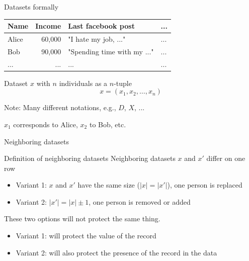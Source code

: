 \documentclass[12pt,aspectratio=169,handout]{beamer}
\begin{document}
\begin{frame}{Datasets formally}
	
\begin{table}
	\begin{tabular}{lrll}
		\toprule
		Name & Income & Last facebook post & ... \\
		\midrule
		Alice & 60,000 & "I hate my job, ..." & ... \\
		Bob & 90,000 & "Spending time with my ..." & ...\\
		... & ... & ... & ...\\
		\bottomrule
	\end{tabular}
\end{table}

\begin{block}{Dataset $x$ with $n$ individuals as a $n$-tuple}
$$
x = (x_1, x_2, \ldots, x_n)
$$
\end{block}

Note: Many different notations, e.g., $D$, $X$, ...

$x_1$ corresponds to Alice, $x_2$ to Bob, etc.


\end{frame}


\begin{frame}{Neighboring datasets}

\begin{block}{Definition of neighboring datasets}
Neighboring datasets $x$ and $x'$ differ on one row
\end{block}

\begin{itemize}
	\item Variant 1: $x$ and $x'$ have the same size ($|x| = |x'|$), one person is replaced
	\item Variant 2: $|x'| = |x| \pm 1$, one person is removed or added
\end{itemize}


These two options will not protect the same thing.

\begin{itemize}
	\item Variant 1: will protect the value of the record
	\item Variant 2: will also protect the presence of the record in the data
\end{itemize}



\end{frame}
\end{document}
